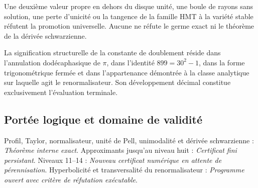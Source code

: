 \begin{remark}
Une deuxième valeur propre en dehors du disque unité, une boule de rayons sans solution, une perte d’unicité ou la tangence de la famille HMT à la variété stable réfutent la promotion universelle. Aucune ne réfute le germe exact ni le théorème de la dérivée schwarzienne.
\end{remark}

\begin{proposition}
La signification structurelle de la constante de doublement réside dans
l’annulation dodécaphasique de \(\pi\), dans l’identité
\(899=30^2-1\), dans la forme trigonométrique fermée et dans l’appartenance
démontrée à la classe analytique sur laquelle agit le renormalisateur. Son
développement décimal constitue exclusivement l’évaluation terminale.
\end{proposition}

\subsection*{Portée logique et domaine de validité}
Profil, Taylor, normalisateur, unité de Pell, unimodalité et dérivée schwarzienne : \emph{Théorème interne exact}. Approximants jusqu’au niveau huit : \emph{Certificat fini persistant}. Niveaux 11--14 : \emph{Nouveau certificat numérique en attente de pérennisation}. Hyperbolicité et transversalité du renormalisateur : \emph{Programme ouvert avec critère de réfutation exécutable}.

